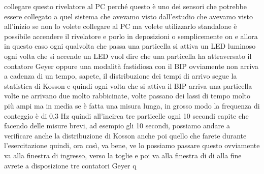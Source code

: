 {collegare questo rivelatore al PC perché questo è uno dei sensori che potrebbe essere collegato a quel sistema che avevamo visto dall'estudio che avevamo visto all'inizio se non lo volete collegare al PC ma volete utilizzarlo standalone è possibile accendere il rivelatore e porlo in deposizioni o semplicemente on e allora in questo caso ogni qualvolta che passa una particella si attiva un LED luminoso ogni volta che si accende un LED vuol dire che una particella ha attraversato il contatore Geyer oppure una modalità fastidiosa con il BIP ovviamente non arriva a cadenza di un tempo, sapete, il distribuzione dei tempi di arrivo segue la statistica di Kosson e quindi ogni volta che si attiva il BIP arriva una particella volte ne arrivano due molto rabbicinate, volte passano dei lassi di tempo molto più ampi ma in media se è fatta una misura lunga, in grosso modo la frequenza di conteggio è di 0,3 Hz quindi all'incirca tre particelle ogni 10 secondi capite che facendo delle misure brevi, ad esempio gli 10 secondi, possiamo andare a verificare anche la distribuzione di Kosson anche poi quello che farete durante l'esercitazione quindi, ora così, va bene, ve lo possiamo passare questo ovviamente va alla finestra di ingresso, verso la toglie e poi va alla finestra di di alla fine avrete a disposizione tre contatori Geyer q
}